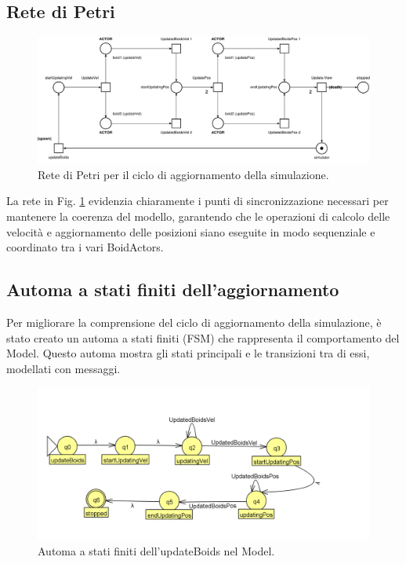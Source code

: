 \documentclass[a4paper,12pt]{report}
\begin{document}
        
        \subsection*{Rete di Petri}
            \begin{figure}[ht!]
                \centering
                \includegraphics[width=\textwidth]{petri_nets_pdf/rete_update_cycle.pdf}
                \caption{Rete di Petri per il ciclo di aggiornamento della simulazione.}
                \label{fig:rete_update_cycle}
            \end{figure}

            La rete in Fig. \ref{fig:rete_update_cycle} evidenzia chiaramente i punti di sincronizzazione necessari per mantenere la coerenza del modello, garantendo che le operazioni di calcolo delle velocità e aggiornamento delle posizioni siano eseguite in modo sequenziale e coordinato tra i vari BoidActors.

        \subsection*{Automa a stati finiti dell'aggiornamento}
            Per migliorare la comprensione del ciclo di aggiornamento della simulazione, è stato creato un automa a stati finiti (FSM) che rappresenta il comportamento del Model. Questo automa mostra gli stati principali e le transizioni tra di essi, modellati con messaggi.

            \begin{figure}[ht!]
                \centering
                \includegraphics[width=\textwidth]{img/FSM/BoidsModel.png}
                \caption{Automa a stati finiti dell'updateBoids nel Model.}
                \label{fig:Boids_model_fsm}
            \end{figure}
\end{document}
